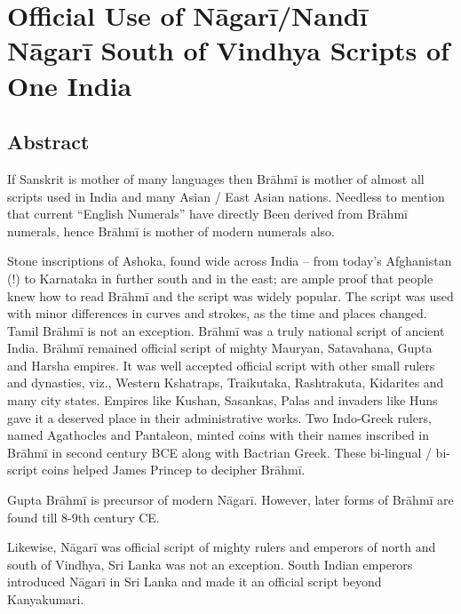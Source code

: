 
\chapter{Official Use of Nāgarī/Nandī Nāgarī South of Vindhya Scripts of One India}\label{chapter5}



\section*{Abstract}

If Sanskrit is mother of many languages then Brāhmī is mother of almost all scripts used in India and many Asian / East Asian nations. Needless to mention that current “English Numerals” have directly Been derived from Brāhmī numerals, hence Brāhmī is mother of modern numerals also.

Stone inscriptions of Ashoka, found wide across India – from today’s Afghanistan (!) to Karnataka in further south and in the east; are ample proof that people knew how to read Brāhmī and the script was widely popular. The script was used with minor differences in curves and strokes, as the time and places changed. Tamil Brāhmī is not an exception. Brāhmī was a truly national script of ancient India. Brāhmī remained official script of mighty Mauryan, Satavahana, Gupta and Harsha empires. It was well accepted official script with other small rulers and dynasties, viz., Western Kshatraps, Traikutaka, Rashtrakuta, Kidarites and many city states. Empires like Kushan, Sasankas, Palas and invaders like Huns gave it a deserved place in their administrative works. Two Indo-Greek rulers, named Agathocles and Pantaleon, minted coins with their names inscribed in Brāhmī in second century BCE along with Bactrian Greek. These bi-lingual / bi-script coins helped James Princep to decipher Brāhmī.

Gupta Brāhmī is precursor of modern Nāgarī. However, later forms of Brāhmī are found till 8-9th century CE.

Likewise, Nāgarī was official script of mighty rulers and emperors of north and south of Vindhya, Sri Lanka was not an exception. South Indian emperors introduced Nāgarī in Sri Lanka and made it an official script beyond Kanyakumari.

